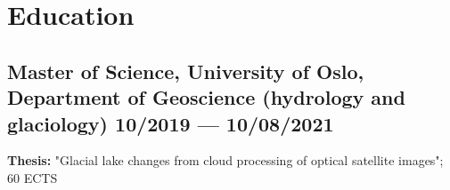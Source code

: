 \documentclass[a4,10pt]{article}
\newenvironment{zitemize}{
\begin{itemize}\itemsep2pt \parskip0pt \parsep1pt}
{\end{itemize}\vspace{-0.5cm}}
\begin{document}
%

\section{Education }
\subsection*{Master of Science, {\normalsize \normalfont University of Oslo, Department of Geoscience (hydrology and glaciology)} \hfill  10/2019 --- 10/08/2021} 
\textbf{Thesis:} "Glacial lake changes from cloud processing of optical satellite images"; 60 ECTS
\vspace{0.1cm}
\end{document}
